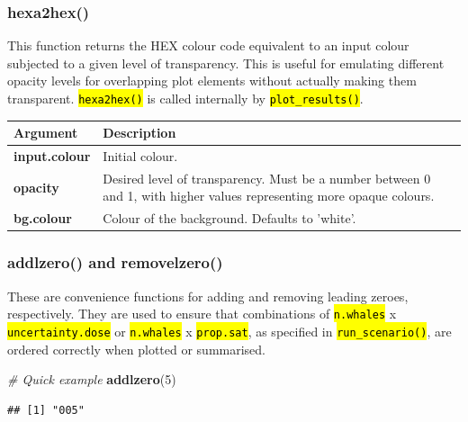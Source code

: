 \documentclass[
]{article}
\newenvironment{Shaded}{\begin{snugshade}}{\end{snugshade}}
\newcommand{\CommentTok}[1]{\textcolor[rgb]{0.56,0.35,0.01}{\textit{#1}}}
\newcommand{\DecValTok}[1]{\textcolor[rgb]{0.00,0.00,0.81}{#1}}
\newcommand{\KeywordTok}[1]{\textcolor[rgb]{0.13,0.29,0.53}{\textbf{#1}}}
\newcommand{\NormalTok}[1]{#1}
\begin{document}
\subsubsection{hexa2hex()}

This function returns the HEX colour code equivalent to an input colour subjected to a given level of transparency.
This is useful for emulating different opacity levels for overlapping plot elements without actually making them transparent. \textcolor{codecolor}{\texttt{\hl{hexa2hex()}}} is called internally by \textcolor{codecolor}{\texttt{\hl{plot\_results()}}}.

\renewcommand{\arraystretch}{1.4}
\begin{table}[H]
\centering
\begin{tabular}{>{\bfseries}l|>{\raggedright\arraybackslash}p{30em}}
\toprule
\textbf{Argument} & \textbf{Description}\\
\midrule
input.colour & Initial colour.\\
opacity & Desired level of transparency. Must be a number between 0 and 1, with higher values representing more opaque colours.\\
bg.colour & Colour of the background. Defaults to 'white'.\\
\bottomrule
\end{tabular}
\end{table}

\subsubsection{addlzero() and removelzero()}

These are convenience functions for adding and removing leading zeroes, respectively. They are used to ensure that combinations of \textcolor{codecolor}{\texttt{\hl{n.whales}}} x \textcolor{codecolor}{\texttt{\hl{uncertainty.dose}}} or \textcolor{codecolor}{\texttt{\hl{n.whales}}} x \textcolor{codecolor}{\texttt{\hl{prop.sat}}}, as specified in \textcolor{codecolor}{\texttt{\hl{run\_scenario()}}}, are ordered correctly when plotted or summarised.

\begin{Shaded}
\begin{Highlighting}[]
\CommentTok{# Quick example}
\KeywordTok{addlzero}\NormalTok{(}\DecValTok{5}\NormalTok{)}
\end{Highlighting}
\end{Shaded}

\begin{verbatim}
## [1] "005"
\end{verbatim}
\end{document}
